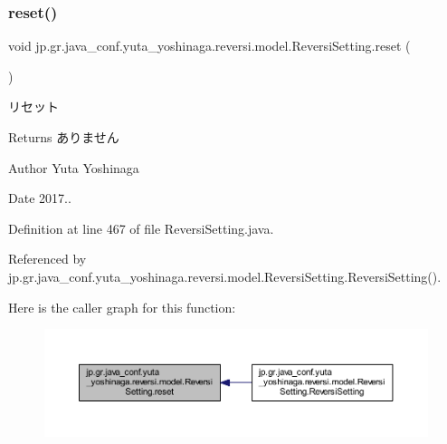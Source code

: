 \subsubsection{\texorpdfstring{reset()}{reset()}}
{\footnotesize\ttfamily void jp.\+gr.\+java\+\_\+conf.\+yuta\+\_\+yoshinaga.\+reversi.\+model.\+Reversi\+Setting.\+reset (\begin{DoxyParamCaption}{ }\end{DoxyParamCaption})}



リセット 

\begin{DoxyReturn}{Returns}
ありません 
\end{DoxyReturn}
\begin{DoxyAuthor}{Author}
Yuta Yoshinaga 
\end{DoxyAuthor}
\begin{DoxyDate}{Date}
2017.. 
\end{DoxyDate}


Definition at line 467 of file Reversi\+Setting.\+java.



Referenced by jp.\+gr.\+java\+\_\+conf.\+yuta\+\_\+yoshinaga.\+reversi.\+model.\+Reversi\+Setting.\+Reversi\+Setting().

Here is the caller graph for this function\+:
\nopagebreak
\begin{figure}[H]
\begin{center}
\leavevmode
\includegraphics[width=350pt]{classjp_1_1gr_1_1java__conf_1_1yuta__yoshinaga_1_1reversi_1_1model_1_1_reversi_setting_afef8530666d1ce3522fd53938cd00353_icgraph}
\end{center}
\end{figure}
\mbox{\label{classjp_1_1gr_1_1java__conf_1_1yuta__yoshinaga_1_1reversi_1_1model_1_1_reversi_setting_a193c4cf0ee146dc95f7ea3cea6df7f54}} 
